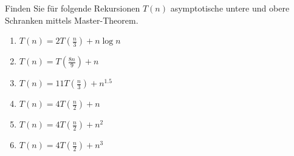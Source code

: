 
\begin{exercise}

Finden Sie für folgende Rekursionen $T(n)$ asymptotische untere und obere Schranken mittels Master-Theorem.

\begin{enumerate}[label = \alph*)]
  \item $T(n) = 2T(\frac{n}{3}) + n \log n$
  \item $T(n) = T(\frac{8n}{9}) + n$
  \item $T(n) = 11T(\frac{n}{3}) + n^{1.5}$
  \item $T(n) = 4T(\frac{n}{2}) + n$
  \item $T(n) = 4T(\frac{n}{2}) + n^2$
  \item $T(n) = 4T(\frac{n}{2}) + n^3$
\end{enumerate}

\end{exercise}


